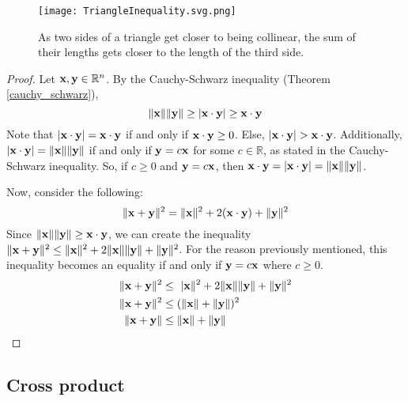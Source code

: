 \documentclass[../main.tex]{subfiles}
\begin{document}
\begin{figure}[H]
	\centering
	\texttt{[image: TriangleInequality.svg.png]}
	\caption{As two sides of a triangle get closer to being collinear,
		the sum of their lengths gets closer to the length of the third side.}
\end{figure}

\begin{proof}
	Let $\mathbf{x}, \mathbf{y} \in \mathbb{R}^n$.
	By the Cauchy-Schwarz inequality (Theorem \ref{cauchy_schwarz}),
	$$\|\mathbf{x}\|\|\mathbf{y}\|\geq |\mathbf{x}\cdot\mathbf{y}|\geq\mathbf{x}\cdot\mathbf{y}$$
	Note that $|\mathbf{x}\cdot\mathbf{y}|=\mathbf{x}\cdot\mathbf{y}$ if and only if
	$\mathbf{x}\cdot\mathbf{y}\geq0$. Else, $|\vect{x}\cdot\vect{y}|>\vect{x}\cdot\vect{y}$.
	Additionally, $|\mathbf{x}\cdot\mathbf{y}|=\|\mathbf{x}\|\|\mathbf{y}\|$ if and only if
	$\mathbf{y}=c\mathbf{x}$ for some $c \in \mathbb{R}$, as stated in the Cauchy-Schwarz inequality.
	So, if $c\geq0$ and $\mathbf{y}=c\mathbf{x}$, then
	$\mathbf{x}\cdot\mathbf{y}=|\mathbf{x}\cdot\mathbf{y}|=\|\mathbf{x}\|\|\mathbf{y}\|$.

	Now, consider the following:
	$$\|\mathbf{x} + \mathbf{y}\|^2  = \|\mathbf{x}\|^2+2(\mathbf{x}\cdot\mathbf{y})+\|\mathbf{y}\|^2 $$
	Since $\|\mathbf{x}\|\|\mathbf{y}\|\geq\mathbf{x}\cdot\mathbf{y}$,
	we can create the inequality $\|\mathbf{x}+\mathbf{y}\|^2\leq\|\mathbf{x}\|^2+2\|\mathbf{x}\|\|\mathbf{y}\|+\|\mathbf{y}\|^2$.
	For the reason previously mentioned, this inequality becomes an equality
	if and only if $\mathbf{y}=c\mathbf{x}$ where $c\geq0$.
	\begin{align*}
		\|\vect{x}+\vect{y}\|^2   & \leq\ |\vect{x}\|^2+2\|\vect{x}\|\|\vect{y}\|+\|\vect{y}\|^2 \\
		\|\vect{x} + \vect{y}\|^2 & \leq (\|\vect{x}\|+\|\vect{y}\|)^2                           \\
		\|\vect{x} + \vect{y}\|   & \leq \|\vect{x}\|+\|\vect{y}\|
	\end{align*}
\end{proof}

\subsection{Cross product}
\end{document}
